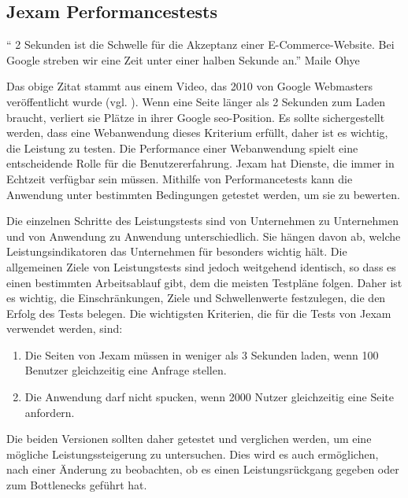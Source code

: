 \subsection{Jexam Performancestests}

\begin{center}
`` 2 Sekunden ist die Schwelle f\"ur die Akzeptanz einer E-Commerce-Website.
Bei Google streben wir eine Zeit unter einer halben Sekunde an.'' Maile Ohye
\end{center}
\>

Das obige Zitat stammt aus einem Video, das 2010 von Google Webmasters
ver\"offentlicht wurde (vgl. \cite{Ohye2010}). Wenn eine Seite l\"anger
als 2 Sekunden zum Laden braucht, verliert sie Pl\"atze in ihrer Google
\acs{seo}-Position. Es sollte sichergestellt werden, dass eine
Webanwendung dieses Kriterium erfüllt, daher ist es wichtig,
die Leistung zu testen. Die Performance einer Webanwendung spielt eine
entscheidende Rolle f\"ur die Benutzererfahrung. Jexam hat Dienste,
die immer in Echtzeit verf\"ugbar sein m\"ussen. Mithilfe von 
Performancetests kann die Anwendung unter bestimmten Bedingungen 
getestet werden, um sie zu bewerten.

Die einzelnen Schritte des Leistungstests sind von Unternehmen
zu Unternehmen und von Anwendung zu Anwendung unterschiedlich.
Sie hängen davon ab, welche Leistungsindikatoren das Unternehmen für
besonders wichtig hält. Die allgemeinen Ziele von Leistungstests
sind jedoch weitgehend identisch, so dass es einen bestimmten
Arbeitsablauf gibt, dem die meisten Testpläne folgen. Daher ist es
wichtig, die Einschränkungen, Ziele und Schwellenwerte festzulegen,
die den Erfolg des Tests belegen. Die wichtigsten Kriterien,
die für die Tests von Jexam verwendet werden, sind:

\noindent
\begin{enumerate}
    \item Die Seiten von Jexam müssen in weniger als 3 Sekunden laden,
    wenn 100 Benutzer gleichzeitig eine Anfrage stellen.
    \item Die Anwendung darf nicht spucken, wenn 2000 Nutzer
    gleichzeitig eine Seite anfordern.
\end{enumerate}

Die beiden Versionen sollten daher getestet und verglichen werden,
um eine mögliche Leistungssteigerung zu untersuchen.
Dies wird es auch ermöglichen, nach einer Änderung zu beobachten, ob
es einen Leistungsrückgang gegeben oder zum Bottlenecks geführt hat.